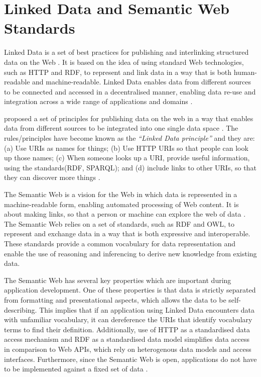 \section{Linked Data and Semantic Web Standards}

Linked Data is a set of best practices for publishing and interlinking structured data on the Web \citep*{bizer2011linkedData}.  It is based on the idea of using standard Web technologies, such as HTTP and RDF, to represent and link data in a way that is both human-readable and machine-readable.  Linked Data enables data from different sources to be connected and accessed in a decentralised manner, enabling data re-use and integration across a wide range of applications and domains \citep*{bizer2011linkedData}.

\citet{lee2006exploring} proposed a set of principles for publishing data on the web in a way that enables data from different sources to be integrated into one single data space \citep*{bizer2011linkedData}.  The rules/principles have become known as the \textit{``Linked Data principle''} and they are: (a) Use URIs as names for things; (b) Use HTTP URIs so that people can look up those names; (c) When someone looks up a URI, provide useful information, using the standards(RDF, SPARQL); and (d) include links to other URIs, so that they can discover more things \citetext{\citealp*{bizer2011linkedData}; \citealp{lee2006exploring}}.

The Semantic Web is a vision for the Web in which data is represented in a machine-readable form, enabling automated processing of Web content.  It is about making links, so that a person or machine can explore the web of data \citep*{bizer2011linkedData}.  The Semantic Web relies on a set of standards, such as RDF and OWL, to represent and exchange data in a way that is both expressive and interoperable.  These standards provide a common vocabulary for data representation and enable the use of reasoning and inferencing to derive new knowledge from existing data.

The Semantic Web has several key properties which are important during application development.  One of these properties is that data is strictly separated from formatting and presentational aspects, which allows the data to be self-describing.  This implies that if an application using Linked Data encounters data with unfamiliar vocabulary, it can dereference the URIs that identify vocabulary terms to find their definition.  Additionally, use of HTTP as a standardised data access mechanism and RDF as a standardised data model simplifies data access in comparison to Web APIs, which rely on heterogenous data models and access interfaces.  Furthermore, since the Semantic Web is open, applications do not have to be implemented against a fixed set of data \citep*{bizer2011linkedData}.

